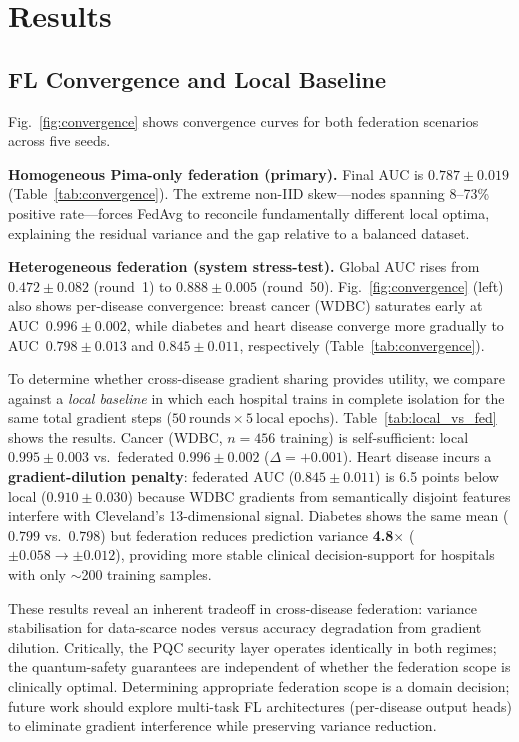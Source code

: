 \documentclass[runningheads]{llncs}
\begin{document}
\section{Results}
\label{sec:results}

\subsection{FL Convergence and Local Baseline}

Fig.~\ref{fig:convergence} shows convergence curves for both
federation scenarios across five seeds.

\textbf{Homogeneous Pima-only federation (primary).}
Final AUC is $0.787 \pm 0.019$ (Table~\ref{tab:convergence}).
The extreme non-IID skew---nodes spanning 8--73\% positive
rate---forces FedAvg to reconcile fundamentally different local
optima, explaining the residual variance and the gap relative to
a balanced dataset.

\textbf{Heterogeneous federation (system stress-test).}
Global AUC rises from $0.472 \pm 0.082$ (round~1) to
$\mathbf{0.888 \pm 0.005}$ (round~50).
Fig.~\ref{fig:convergence} (left) also shows per-disease convergence:
breast cancer (WDBC) saturates early at AUC~$0.996 \pm 0.002$,
while diabetes and heart disease converge more gradually to
AUC~$0.798 \pm 0.013$ and $0.845 \pm 0.011$, respectively
(Table~\ref{tab:convergence}).

To determine whether cross-disease gradient sharing provides utility,
we compare against a \emph{local baseline} in which each hospital
trains in complete isolation for the same total gradient steps
($50~\text{rounds} \times 5~\text{local epochs}$).
Table~\ref{tab:local_vs_fed} shows the results.
Cancer (WDBC, $n{=}456$ training) is self-sufficient: local
$0.995 \pm 0.003$ vs.\ federated $0.996 \pm 0.002$
($\Delta = +0.001$).
Heart disease incurs a \textbf{gradient-dilution penalty}: federated
AUC ($0.845 \pm 0.011$) is 6.5 points below local ($0.910 \pm 0.030$)
because WDBC gradients from semantically disjoint features interfere
with Cleveland's 13-dimensional signal.
Diabetes shows the same mean ($0.799$ vs.\ $0.798$) but federation
reduces prediction variance \textbf{4.8$\times$}
($\pm0.058 \to \pm0.012$), providing more stable clinical
decision-support for hospitals with only $\sim$200 training samples.

These results reveal an inherent tradeoff in cross-disease
federation: variance stabilisation for data-scarce nodes versus
accuracy degradation from gradient dilution.
Critically, the PQC security layer operates identically in both
regimes; the quantum-safety guarantees are independent of whether
the federation scope is clinically optimal.
Determining appropriate federation scope is a domain decision;
future work should explore multi-task FL architectures (per-disease
output heads) to eliminate gradient interference while preserving
variance reduction.
\end{document}
